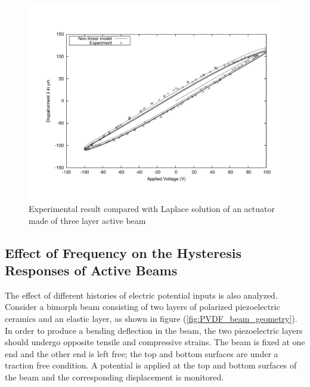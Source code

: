 \begin{figure}
\centering
\includegraphics[width=6.0in]{./chap_4_structural_analyses/pdf_beam/electric_field_vs_displacement_three_layer_beam.pdf}
\caption{Experimental result \cite{Li2004959} compared with Laplace solution of an actuator made of three layer active beam}
\label{fig:electric_volt_vs_displacement_three_layer_beam}
\end{figure}


\subsection{Effect of Frequency on the Hysteresis Responses of Active Beams}
The effect of different histories of electric potential inputs is also analyzed.
Consider a bimorph beam consisting of two layers of polarized piezoelectric ceramics and an elastic layer, as shown in figure (\ref{fig:PVDF_beam_geometry}). %
In order to produce a bending deflection in the beam, the two piezoelectric layers should undergo opposite tensile and compressive strains.
The beam is fixed at one end and the other end is left free;
 the top and bottom surfaces are under a traction free condition.
 A potential is applied at the top and bottom surfaces of the beam and the corresponding displacement is monitored.


